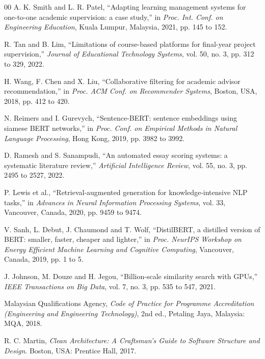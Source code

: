 \documentclass[conference,a4paper]{IEEEtran}
\begin{document}
\begin{thebibliography}{00}
 A. K. Smith and L. R. Patel, ``Adapting learning management systems for one-to-one academic supervision: a case study,'' in \emph{Proc. Int. Conf. on Engineering Education}, Kuala Lumpur, Malaysia, 2021, pp. 145 to 152.

 R. Tan and B. Lim, ``Limitations of course-based platforms for final-year project supervision,'' \emph{Journal of Educational Technology Systems}, vol. 50, no. 3, pp. 312 to 329, 2022.

 H. Wang, F. Chen and X. Liu, ``Collaborative filtering for academic advisor recommendation,'' in \emph{Proc. ACM Conf. on Recommender Systems}, Boston, USA, 2018, pp. 412 to 420.

 N. Reimers and I. Gurevych, ``Sentence-BERT: sentence embeddings using siamese BERT networks,'' in \emph{Proc. Conf. on Empirical Methods in Natural Language Processing}, Hong Kong, 2019, pp. 3982 to 3992.

 D. Ramesh and S. Sanampudi, ``An automated essay scoring systems: a systematic literature review,'' \emph{Artificial Intelligence Review}, vol. 55, no. 3, pp. 2495 to 2527, 2022.

 P. Lewis et al., ``Retrieval-augmented generation for knowledge-intensive NLP tasks,'' in \emph{Advances in Neural Information Processing Systems}, vol. 33, Vancouver, Canada, 2020, pp. 9459 to 9474.

 V. Sanh, L. Debut, J. Chaumond and T. Wolf, ``DistilBERT, a distilled version of BERT: smaller, faster, cheaper and lighter,'' in \emph{Proc. NeurIPS Workshop on Energy Efficient Machine Learning and Cognitive Computing}, Vancouver, Canada, 2019, pp. 1 to 5.

 J. Johnson, M. Douze and H. Jegou, ``Billion-scale similarity search with GPUs,'' \emph{IEEE Transactions on Big Data}, vol. 7, no. 3, pp. 535 to 547, 2021.

 Malaysian Qualifications Agency, \emph{Code of Practice for Programme Accreditation (Engineering and Engineering Technology)}, 2nd ed., Petaling Jaya, Malaysia: MQA, 2018.

 R. C. Martin, \emph{Clean Architecture: A Craftsman's Guide to Software Structure and Design}. Boston, USA: Prentice Hall, 2017.
\end{thebibliography}
\end{document}
